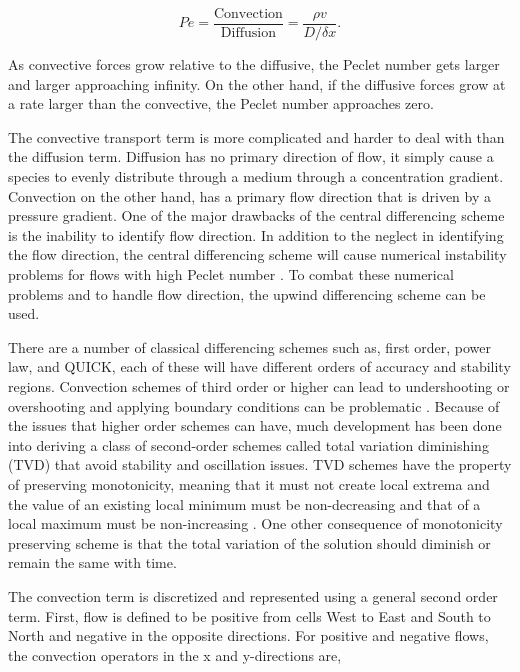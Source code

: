 \begin{equation}
    Pe = \frac{\text{Convection}}{\text{Diffusion}} = \frac{\rho v}{D/\delta x}.
\end{equation}

\noindent As convective forces grow relative to the diffusive, the Peclet number gets larger and larger approaching infinity. On the other hand, if the diffusive forces grow at a rate larger than the convective, the Peclet number approaches zero. 

The convective transport term is more complicated and harder to deal with than the diffusion term. Diffusion has no primary direction of flow, it simply cause a species to evenly distribute through a medium through a concentration gradient. Convection on the other hand, has a primary flow direction that is driven by a pressure gradient. One of the major drawbacks of the central differencing scheme is the inability to identify flow direction. In addition to the neglect in identifying the flow direction, the central differencing scheme will cause numerical instability problems for flows with high Peclet number \cite{versteeg2007}. To combat these numerical problems and to handle flow direction, the upwind differencing scheme can be used. 

There are a number of classical differencing schemes such as, first order, power law, and QUICK, each of these will have different orders of accuracy and stability regions. Convection schemes of third order or higher can lead to undershooting or overshooting and applying boundary conditions can be problematic \cite{versteeg2007}. Because of the issues that higher order schemes can have, much development has been done into deriving a class of second-order schemes called total variation diminishing (TVD) that avoid stability and oscillation issues. TVD schemes have the property of preserving monotonicity, meaning that it must not create local extrema and the value of an existing local minimum must be non-decreasing and that of a local maximum must be non-increasing \cite{versteeg2007}. One other consequence of monotonicity preserving scheme is that the total variation of the solution should diminish or remain the same with time. 

The convection term is discretized and represented using a general second order term. First, flow is defined to be positive from cells West to East and South to North and negative in the opposite directions. For positive and negative flows, the convection operators in the x and y-directions are,

